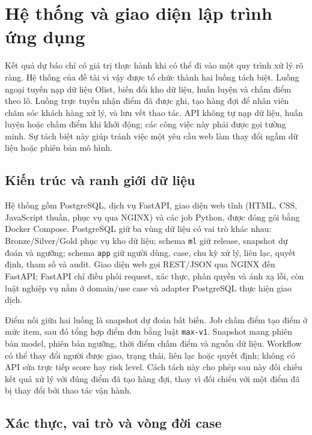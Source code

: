 \section{Hệ thống và giao diện lập trình ứng dụng}\label{sec:system-api}

Kết quả dự báo chỉ có giá trị thực hành khi có thể đi vào một quy trình xử lý rõ ràng. Hệ thống của đề tài vì vậy được tổ chức thành hai luồng tách biệt. Luồng ngoại tuyến nạp dữ liệu Olist, biến đổi kho dữ liệu, huấn luyện và chấm điểm theo lô. Luồng trực tuyến nhận điểm đã được ghi, tạo hàng đợi để nhân viên chăm sóc khách hàng xử lý, và lưu vết thao tác. API không tự nạp dữ liệu, huấn luyện hoặc chấm điểm khi khởi động; các công việc này phải được gọi tường minh. Sự tách biệt này giúp tránh việc một yêu cầu web làm thay đổi ngầm dữ liệu hoặc phiên bản mô hình.

\subsection{Kiến trúc và ranh giới dữ liệu}

Hệ thống gồm PostgreSQL, dịch vụ FastAPI, giao diện web tĩnh (HTML, CSS, JavaScript thuần, phục vụ qua NGINX) và các job Python, được đóng gói bằng Docker Compose. PostgreSQL giữ ba vùng dữ liệu có vai trò khác nhau: Bronze/Silver/Gold phục vụ kho dữ liệu; schema \texttt{ml} giữ release, snapshot dự đoán và ngưỡng; schema \texttt{app} giữ người dùng, case, chu kỳ xử lý, liên lạc, quyết định, tham số và audit. Giao diện web gọi REST/JSON qua NGINX đến FastAPI; FastAPI chỉ điều phối request, xác thực, phân quyền và ánh xạ lỗi, còn luật nghiệp vụ nằm ở domain/use case và adapter PostgreSQL thực hiện giao dịch.

Điểm nối giữa hai luồng là snapshot dự đoán bất biến. Job chấm điểm tạo điểm ở mức item, sau đó tổng hợp điểm đơn bằng luật \texttt{max-v1}. Snapshot mang phiên bản model, phiên bản ngưỡng, thời điểm chấm điểm và nguồn dữ liệu. Workflow có thể thay đổi người được giao, trạng thái, liên lạc hoặc quyết định; không có API sửa trực tiếp score hay risk level. Cách tách này cho phép sau này đối chiếu kết quả xử lý với đúng điểm đã tạo hàng đợi, thay vì đối chiếu với một điểm đã bị thay đổi bởi thao tác vận hành.

\subsection{Xác thực, vai trò và vòng đời case}

